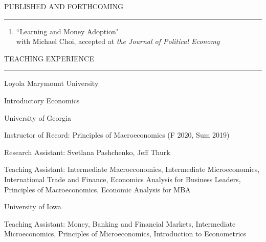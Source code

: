 \documentclass{resume} %
\renewenvironment{rSection}[1]{
\sectionskip
\textcolor{lmublue}{\MakeUppercase{#1}}
\sectionlineskip
\hrule
\begin{list}{}{
\setlength{\leftmargin}{1.5em}
}
\item[]
}{
\end{list}
}
\begin{document}

\begin{rSection}{Published and forthcoming}
\begin{enumerate} 
\item ``Learning and Money Adoption" 
	\\ with Michael Choi, accepted at {\it the Journal of Political Economy} 
\end{enumerate}
\end{rSection}


\begin{rSection}{TEACHING EXPERIENCE}
\begin{rSubsection}{Loyola Marymount University}{}{}{}
\item Introductory Economics
\end{rSubsection}

\begin{rSubsection}{University of Georgia 
}{}{}{}
\item Instructor of Record: Principles of Macroeconomics (F 2020, Sum 2019)
\item Research Assistant: Svetlana Pashchenko, Jeff Thurk
\item Teaching Assistant: Intermediate Macroeconomics, Intermediate Microeconomics, International Trade and Finance, Economics Analysis for Business Leaders, Principles of Macroeconomics, Economic Analysis for MBA   
\end{rSubsection}

\begin{rSubsection}{University of Iowa}{}{}{}			

\item Teaching Assistant: Money, Banking and Financial Markets, Intermediate Microeconomics, Principles of Microeconomics, Introduction to Econometrics

\end{rSubsection}
\end{rSection}

\end{document}
